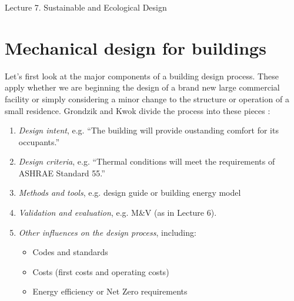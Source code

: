\documentclass[10pt]{article}
\begin{document}
   \noindent
   \begin{center}

   \hrulefill
   
   \vspace{5pt}
   
   \vspace{0pt}
   
   {\Large \hfill  Lecture 7. Sustainable and Ecological Design}
   \vspace{5pt}
   
  
   \hrulefill
   \end{center}
   
   {}
   
\section{Mechanical design for buildings}

Let's first look at the major components of a building design process. These apply whether we are beginning the design of a brand new large commercial facility or simply considering a minor change to the structure or operation of a small residence. Grondzik and Kwok divide the process into these pieces \cite{Grondzik2014-gt}:

\begin{enumerate}
    \item \textit{Design intent}, e.g. ``The building will provide oustanding comfort for its occupants.''
    \item \textit{Design criteria}, e.g. ``Thermal conditions will meet the requirements of ASHRAE Standard 55.''
    \item \textit{Methods and tools}, e.g. design guide or building energy model
\item \textit{Validation and evaluation}, e.g. M\&V (as in Lecture 6).
\item \textit{Other influences on the design process}, including:
        \begin{itemize}
            \item Codes and standards
            \item Costs (first costs and operating costs)
            \item Energy efficiency or Net Zero requirements
        \end{itemize}
\end{enumerate}
\end{document}
